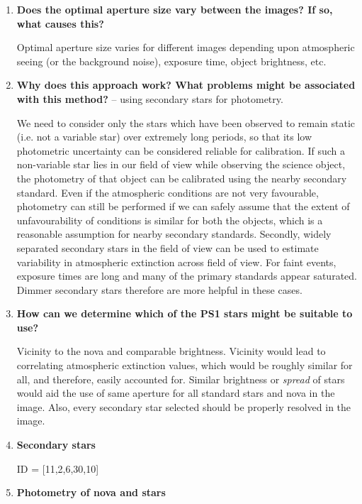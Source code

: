\documentclass{article}
\begin{document}
\begin{enumerate}
		\item \textbf{Does the optimal aperture size vary between the images? If so, what causes this?}
		
		Optimal aperture size varies for different images depending upon atmospheric seeing (or the background noise), exposure time, object brightness, etc.
		
		\item \textbf{Why does this approach work? What problems might be associated with this method?} -- using secondary stars for photometry.
		
		We need to consider only the stars which have been observed to remain static (i.e. not a variable star) over extremely long periods, so that its low photometric uncertainty can be considered reliable for calibration. If such a non-variable star lies in our field of view while observing the science object, the photometry of that object can be calibrated using the nearby secondary standard. Even if the atmospheric conditions are not very favourable, photometry can still be performed if we can safely assume that the extent of unfavourability of conditions is similar for both the objects, which is a reasonable assumption for nearby secondary standards. Secondly, widely separated secondary stars in the field of view can be used to estimate variability in atmospheric extinction across field of view. For faint events, exposure times are long and many of the primary standards appear saturated. Dimmer secondary stars therefore are more helpful in these cases.
		
		 \item \textbf{How can we determine which of the PS1 stars might be suitable to use?}
		
		Vicinity to the nova and comparable brightness. Vicinity would lead to correlating atmospheric extinction values, which would be roughly similar for all, and therefore, easily accounted for. Similar brightness or \emph{spread} of stars would aid the use of same aperture for all standard stars and nova in the image. Also, every secondary star selected should be properly resolved in the image.
		
		\item \textbf{Secondary stars}
		
		ID = [11,2,6,30,10]
		
		\item \textbf{Photometry of nova and stars}
		

\end{enumerate}
\end{document}
